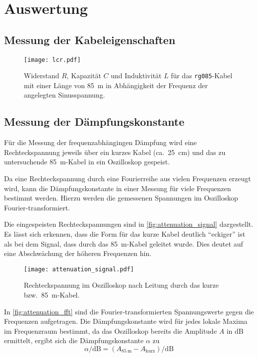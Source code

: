 \section{Auswertung}
\label{sec:Auswertung}

\subsection{Messung der Kabeleigenschaften}

\begin{figure}
  \centering
  \texttt{[image: lcr.pdf]}
  \caption{Widerstand $R$, Kapazität $C$ und Induktivität $L$ für das \texttt{rg085}-Kabel mit einer Länge von \SI{85}{\meter} in Abhängigkeit der Frequenz der angelegten Sinusspannung.}
  \label{fig:lcr}
\end{figure}


\subsection{Messung der Dämpfungskonstante}

Für die Messung der frequenzabhängingen Dämpfung wird eine Rechteckspannung 
jeweils über ein kurzes Kabel (ca.\ \SI{25}{\centi\meter}) und das zu untersuchende \SI{85}{\meter}-Kabel in ein Oszilloskop gespeist.

Da eine Rechteckspannung durch eine Fourierreihe aus vielen Frequenzen erzeugt wird,
kann die Dämpfungskonstante in einer Messung für viele Frequenzen bestimmt werden.
Hierzu werden die gemessenen Spannungen im Oszilloskop Fourier-transformiert.

Die eingespeisten Rechteckspannungen sind in \autoref{fig:attenuation_signal} dargestellt.
Es lässt sich erkennen, dass die Form für das kurze Kabel deutlich \enquote{eckiger} ist als bei dem Signal, dass durch das \SI{85}{\meter}-Kabel geleitet wurde.
Dies deutet auf eine Abschwächung der höheren Frequenzen hin.

\begin{figure}
  \centering
  \texttt{[image: attenuation\_signal.pdf]}
  \caption{%
    Rechteckspannung im Oszilloskop nach Leitung durch das kurze bzw.\ \SI{85}{\meter}-Kabel.%
  }\label{fig:attenuation_signal}
\end{figure}

In \autoref{fig:attenuation_fft} sind die Fourier-transformierten Spannungswerte gegen die Frequenzen aufgetragen.
Die Dämpfungskonstante wird für jedes lokale Maxima im Frequenzraum bestimmt,
da das Oszilloskop bereits die Amplitude $A$ in \si{\deci\bel} ermittelt, ergibt sich die Dämpfungskonstante $α$ zu
\begin{equation}
  α / \si{\deci\bel} = (A_{\SI{85}{\meter}} - A_\text{kurz}) / \si{\deci\bel}
\end{equation}


